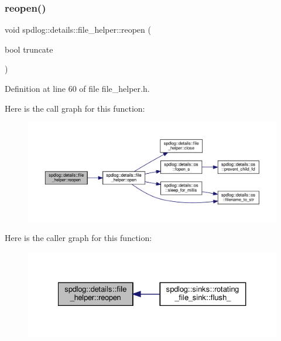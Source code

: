 \mbox{\label{classspdlog_1_1details_1_1file__helper_a21c688da7f241c53871b462c3a5c2c94}} 
\subsubsection{\texorpdfstring{reopen()}{reopen()}}
{\footnotesize\ttfamily void spdlog\+::details\+::file\+\_\+helper\+::reopen (\begin{DoxyParamCaption}\item[{bool}]{truncate }\end{DoxyParamCaption})\hspace{0.3cm}{\ttfamily [inline]}}



Definition at line 60 of file file\+\_\+helper.\+h.

Here is the call graph for this function\+:
\nopagebreak
\begin{figure}[H]
\begin{center}
\leavevmode
\includegraphics[width=350pt]{classspdlog_1_1details_1_1file__helper_a21c688da7f241c53871b462c3a5c2c94_cgraph}
\end{center}
\end{figure}
Here is the caller graph for this function\+:
\nopagebreak
\begin{figure}[H]
\begin{center}
\leavevmode
\includegraphics[width=327pt]{classspdlog_1_1details_1_1file__helper_a21c688da7f241c53871b462c3a5c2c94_icgraph}
\end{center}
\end{figure}
\mbox{\label{classspdlog_1_1details_1_1file__helper_ae945d9701134218c2d0558958e9d1cf2}} 
